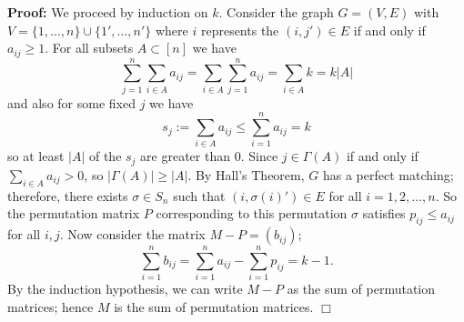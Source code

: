 \documentclass[11pt]{article}
\newenvironment{proof}{\noindent \textbf{Proof:}}{$\Box$}
\newcommand{\ignore}[1]{} %
\begin{document}
\begin{proof}
    We proceed by induction on $k$. Consider the graph $G = (V,E)$ with $V = \{1,\ldots,n\}\cup\{1',\ldots,n'\}$
    where $i$ represents the $(i,j') \in E$ if and only if $a_{ij} \ge 1$. For all subsets $A \subset [n]$ we 
    have \[\sum_{j=1}^n \sum_{i\in A} a_{ij} = \sum_{i\in A} \sum_{j=1}^n a_{ij} = \sum_{i\in A} k = k|A|\]
    and also for some fixed $j$ we have \[s_j:=\sum_{i\in A} a_{ij} \le \sum_{i=1}^n a_{ij} = k\] so at least $|A|$ of the $s_j$ are greater than $0$.
    Since $j \in \Gamma(A)$ if and only if $\sum_{i \in A} a_{ij} > 0$, so $|\Gamma(A)| \ge |A|$.
    By Hall's Theorem, $G$ has a perfect matching; therefore, there exists $\sigma \in S_n$ such that $(i,\sigma(i)') \in E$ for all $i=1,2,\ldots,n$.
    So the permutation matrix $P$ corresponding to this permutation $\sigma$ satisfies $p_{ij} \le a_{ij}$ for all $i,j$.
    Now consider the matrix $M-P = (b_{ij})$; \[\sum_{i=1}^n b_{ij} = \sum_{i=1}^n a_{ij} - \sum_{i=1}^n p_{ij} = k-1.\]
    By the induction hypothesis, we can write $M-P$ as the sum of permutation matrices; hence $M$ is the sum of permutation matrices.
\end{proof}

\ignore{This sentence won't appear in the latex output.}
\end{document}
